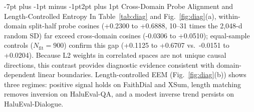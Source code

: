 \documentclass[10pt,twocolumn,letterpaper]{article}
\makeatletter
\renewcommand{\subsection}{\@startsection{subsection}{2}{\z@}%
  {-7pt plus -1pt minus -1pt}{2pt plus 1pt}%
  {\normalfont\normalsize\itshape\color{black}}}
\makeatother
\begin{document}
\subsection{Cross-Domain Probe Alignment and Length-Controlled Entropy}
In Table~\ref{tab:diag} and Fig.~\ref{fig:diag}(a), within-domain split-half probe cosines (+0.2300 to +0.6888, 10--31 times the 2,048-d random SD) far exceed cross-domain cosines (-0.0306 to +0.0510); equal-sample controls ($N_{\text{fit}} = 900$) confirm this gap (+0.1125 to +0.6707 vs.\ -0.0151 to +0.0204). Because L2 weights in correlated spaces are not unique causal directions, this contrast provides diagnostic evidence consistent with domain-dependent linear boundaries. Length-controlled EEM (Fig.~\ref{fig:diag}(b)) shows three regimes: positive signal holds on FaithDial and XSum, length matching removes inversion on HaluEval-QA, and a modest inverse trend persists on HaluEval-Dialogue.
\end{document}
